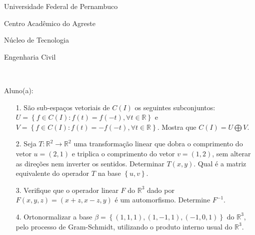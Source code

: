 \documentclass[oneside,a4paper,12pt]{article}
\newcommand{\universidade}{Universidade Federal de Pernambuco}
\newcommand{\centro}{Centro Acadêmico do Agreste}
\newcommand{\departamento}{Núcleo de Tecnologia}
\newcommand{\curso}{Engenharia Civil}
\begin{document}
	\pagestyle{empty}
	
	\begin{center}
	 	\vspace{0pt}
	 	
		\universidade
		\par
		\centro
		\par
		\departamento
		\par
		\curso
		\par
		\vspace{08pt}
		\\
	\end{center}
	
	
	\begin{flushleft}
		Aluno(a):
	\end{flushleft}
	
\begin{itemize}
\item[1.]  São sub-espaços vetoriais de $C(I)$ os seguintes subconjuntos: $U=\left\lbrace f\in C(I): f(t)=f(-t), \forall t\in \mathbb{R}\right\rbrace $ e $V= \left\lbrace f\in C(I): f(t)=-f(-t),\forall t\in \mathbb{R}\right\rbrace $. Mostra que $C(I)=U\bigoplus V$.
\end{itemize}
\begin{itemize}
\item[2.] Seja $T:\mathbb{R}^2\longrightarrow \mathbb{R}^2 $ uma transformação linear que dobra o comprimento do vetor $u=(2,1)$ e triplica o comprimento do vetor $v=(1,2)$, sem alterar as direções nem inverter os sentidos. Determinar $T(x,y)$. Qual é a matriz equivalente do operador $T$ na base $\left\lbrace u,v\right\rbrace$.
 \end{itemize}
 \begin{itemize}
\item [3.] Verifique que o operador linear $F$ do $\mathbb{R}^{3}$ dado por $F(x,y,z)=(x+z,x-z,y)$ é um automorfismo. Determine $F^{-1}$.
\end{itemize}
\begin{itemize}
\item[4.] Ortonormalizar a base $\beta=\left\lbrace (1,1,1),(1,-1,1),(-1,0,1)\right\rbrace $ do $\mathbb{R}^{3}$, pelo processo de Gram-Schmidt, utilizando o produto interno usual do  $\mathbb{R}^{3}$. 
\end{itemize}
\end{document}
